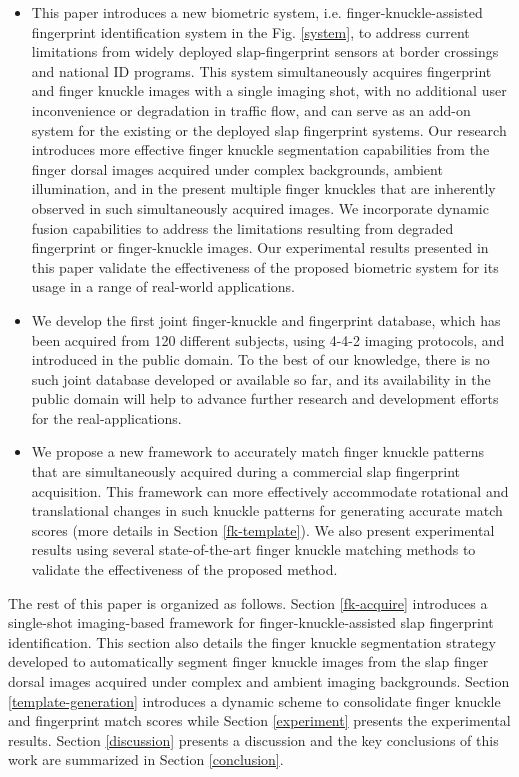 \begin{itemize}
    \item This paper introduces a new biometric system, i.e. finger-knuckle-assisted fingerprint identification system in the Fig. \ref{system}, to address current limitations from widely deployed slap-fingerprint sensors at border crossings and national ID programs. This system simultaneously acquires fingerprint and finger knuckle images with a single imaging shot, with no additional user inconvenience or degradation in traffic flow, and can serve as an add-on system for the existing or the deployed slap fingerprint systems. Our research introduces more effective finger knuckle segmentation capabilities from the finger dorsal images acquired under complex backgrounds, ambient illumination, and in the present multiple finger knuckles that are inherently observed in such simultaneously acquired images. We incorporate dynamic fusion capabilities to address the limitations resulting from degraded fingerprint or finger-knuckle images. Our experimental results presented in this paper validate the effectiveness of the proposed biometric system for its usage in a range of real-world applications. 
    \item We develop the first joint finger-knuckle and fingerprint database, which has been acquired from 120 different subjects, using 4-4-2 imaging protocols, and introduced in the public domain. To the best of our knowledge, there is no such joint database developed or available so far, and its availability in the public domain will help to advance further research and development efforts for the real-applications. 
    \item We propose a new framework to accurately match finger knuckle patterns that are simultaneously acquired during a commercial slap fingerprint acquisition. This framework can more effectively accommodate rotational and translational changes in such knuckle patterns for generating accurate match scores (more details in Section \ref{fk-template}). We also present experimental results using several state-of-the-art finger knuckle matching methods to validate the effectiveness of the proposed method. 
\end{itemize}


The rest of this paper is organized as follows. Section \ref{fk-acquire} introduces a single-shot imaging-based framework for finger-knuckle-assisted slap fingerprint identification. This section also details the finger knuckle segmentation strategy developed to automatically segment finger knuckle images from the slap finger dorsal images acquired under complex and ambient imaging backgrounds. Section \ref{template-generation} introduces a dynamic scheme to consolidate finger knuckle and fingerprint match scores while Section \ref{experiment} presents the experimental results. Section \ref{discussion} presents a discussion and the key conclusions of this work are summarized in Section \ref{conclusion}.
